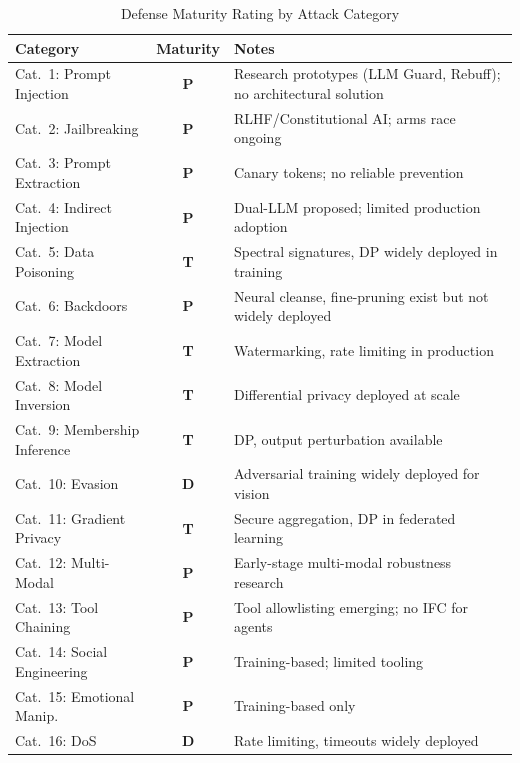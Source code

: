 \documentclass[conference]{IEEEtran}
\newcommand{\tableheaderrow}{\rowcolor{accentblue}}
\renewcommand{\thead}[1]{\textbf{\color{white}\sffamily #1}}
\begin{document}
\begin{table}[!htbp]
\centering
\caption{Defense Maturity Rating by Attack Category}
\label{tab:defense_maturity}
\renewcommand{\arraystretch}{1.1}
\scriptsize\sffamily
\begin{tabular}{p{2.5cm}cp{3.5cm}}
\toprule
\tableheaderrow \thead{Category} & \thead{Maturity} & \thead{Notes} \\
\midrule
\rowcolor{critred!8} Cat.\ 1: Prompt Injection & \textbf{P} & Research prototypes (LLM Guard, Rebuff); no architectural solution \\
\rowcolor{critred!8} Cat.\ 2: Jailbreaking & \textbf{P} & RLHF/Constitutional AI; arms race ongoing \\
\rowcolor{rowalt} Cat.\ 3: Prompt Extraction & \textbf{P} & Canary tokens; no reliable prevention \\
\rowcolor{critred!8} Cat.\ 4: Indirect Injection & \textbf{P} & Dual-LLM proposed; limited production adoption \\
\rowcolor{rowalt} Cat.\ 5: Data Poisoning & \textbf{T} & Spectral signatures, DP widely deployed in training \\
Cat.\ 6: Backdoors & \textbf{P} & Neural cleanse, fine-pruning exist but not widely deployed \\
\rowcolor{rowalt} Cat.\ 7: Model Extraction & \textbf{T} & Watermarking, rate limiting in production \\
Cat.\ 8: Model Inversion & \textbf{T} & Differential privacy deployed at scale \\
\rowcolor{rowalt} Cat.\ 9: Membership Inference & \textbf{T} & DP, output perturbation available \\
Cat.\ 10: Evasion & \textbf{D} & Adversarial training widely deployed for vision \\
\rowcolor{rowalt} Cat.\ 11: Gradient Privacy & \textbf{T} & Secure aggregation, DP in federated learning \\
Cat.\ 12: Multi-Modal & \textbf{P} & Early-stage multi-modal robustness research \\
\rowcolor{rowalt} Cat.\ 13: Tool Chaining & \textbf{P} & Tool allowlisting emerging; no IFC for agents \\
Cat.\ 14: Social Engineering & \textbf{P} & Training-based; limited tooling \\
\rowcolor{rowalt} Cat.\ 15: Emotional Manip. & \textbf{P} & Training-based only \\
Cat.\ 16: DoS & \textbf{D} & Rate limiting, timeouts widely deployed \\

\end{tabular}
\end{table}
\end{document}
